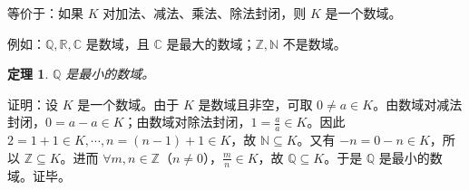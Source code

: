 \documentclass[UTF8,11pt]{ctexart}
\theoremstyle{cnthm}
\newtheorem{thm}{定理}[section]
\begin{document}
等价于：如果 $K$ 对加法、减法、乘法、除法封闭，则 $K$ 是一个数域。

例如：$\mathbb{Q},\mathbb{R},\mathbb{C}$ 是数域，且 $\mathbb{C}$ 是最大的数域；$\mathbb{Z},\mathbb{N}$ 不是数域。

\begin{thm}
$\mathbb{Q}$ 是最小的数域。
\end{thm}

证明：设 $K$ 是一个数域。由于 $K$ 是数域且非空，可取 $0\neq a\in K$。由数域对减法封闭，$0=a-a\in K$；由数域对除法封闭，$1=\frac{a}{a}\in K$。因此 $2=1+1\in K,\cdots,n=(n-1)+1\in K$，故 $\mathbb{N}\subseteq K$。又有 $-n=0-n\in K$，所以 $\mathbb{Z}\subseteq K$。进而 $\forall m,n\in\mathbb{Z}$（$n\neq0$），$\frac{m}{n}\in K$，故 $\mathbb{Q}\subseteq K$。于是 $\mathbb{Q}$ 是最小的数域。证毕。
\end{document}
